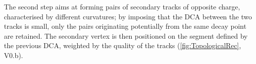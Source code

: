 The second step aims at forming pairs of secondary tracks of opposite charge, \ie characterised by different curvatures; by imposing that the DCA between the two tracks is small, only the pairs originating potentially from the same decay point are retained. The secondary vertex is then positioned on the segment defined by the previous DCA, weighted by the quality of the tracks (\fig\ref{fig:TopologicalRec}, V0.b).


